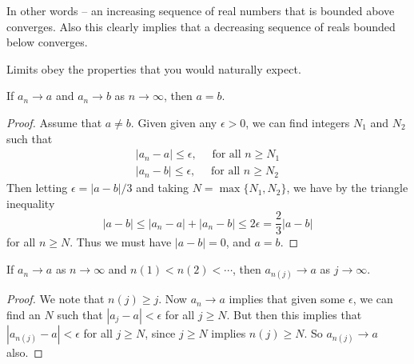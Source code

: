 In other words -- an increasing sequence of real numbers that is bounded above converges. Also this clearly implies that a decreasing sequence of reals bounded below converges.

Limits obey the properties that you would naturally expect.
 
\begin{proposition}
	If $a_n \rightarrow a$ and $a_n \rightarrow b$ as $n \rightarrow \infty$, then $a = b$.
\end{proposition}
\begin{proof}
	Assume that $a \neq b$. Given given any $\epsilon > 0$, we can find integers $N_1$ and $N_2$ such that
	\begin{align*}
		|a_n - a| \leq \epsilon, \quad \text{ for all $n \geq N_1$}\\
		|a_n - b| \leq \epsilon, \quad \text{ for all $n \geq N_2$}
	\end{align*}
	Then letting $\epsilon = |a - b|/3$ and taking $N = \max\{N_1, N_2\}$, we have by the triangle inequality
	$$
	|a - b| \leq |a_n - a| + |a_n - b| \leq 2\epsilon = \frac{2}{3} |a - b|
	$$
	for all $n \geq N$.
	Thus we must have $|a - b| = 0$, and $a = b$.
\end{proof}

\begin{proposition}
	If $a_n \rightarrow a$ as $n \rightarrow \infty$ and $n(1) < n(2) < \cdots$, then $a_{n(j)} \rightarrow a$ as $j \rightarrow \infty$.
\end{proposition}
\begin{proof}
	We note that $n(j) \geq j$. Now $a_n \rightarrow a$ implies that given some $\epsilon$, we can find an $N$ such that $|a_j - a| < \epsilon$ for all $j \geq N$. But then this implies that $|a_{n(j)} - a| < \epsilon$ for all $j \geq N$, since $j \geq N$ implies $n(j) \geq N$. So $a_{n(j)} \rightarrow a$ also.
\end{proof}


